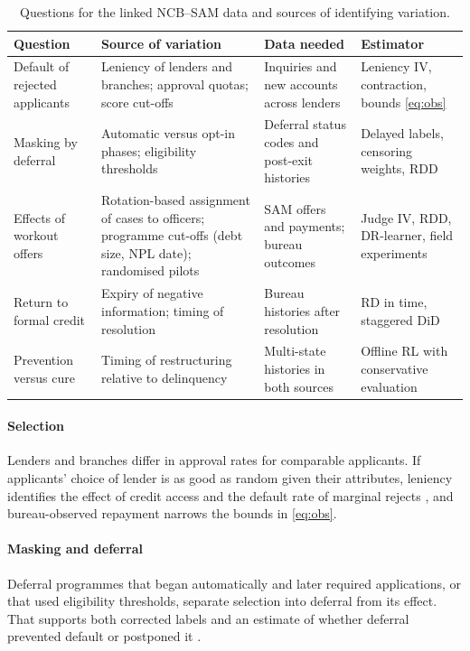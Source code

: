 \documentclass[10pt]{article}
\begin{document}
\begin{table}[t]
\centering\small
\caption{Questions for the linked NCB--SAM data and sources of identifying variation.}
\label{tab:agenda}
\begin{tabularx}{\textwidth}{>{\raggedright\arraybackslash}p{2.9cm} >{\raggedright\arraybackslash}X >{\raggedright\arraybackslash}p{3.6cm} >{\raggedright\arraybackslash}p{3.2cm}}
\toprule
Question & Source of variation & Data needed & Estimator \\
\midrule
Default of rejected applicants & Leniency of lenders and branches; approval quotas; score cut-offs & Inquiries and new accounts across lenders & Leniency IV, contraction, bounds \eqref{eq:obs} \\
Masking by deferral & Automatic versus opt-in phases; eligibility thresholds & Deferral status codes and post-exit histories & Delayed labels, censoring weights, RDD \\
Effects of workout offers & Rotation-based assignment of cases to officers; programme cut-offs (debt size, NPL date); randomised pilots & SAM offers and payments; bureau outcomes & Judge IV, RDD, DR-learner, field experiments \\
Return to formal credit & Expiry of negative information; timing of resolution & Bureau histories after resolution & RD in time, staggered DiD \citep{callaway2021} \\
Prevention versus cure & Timing of restructuring relative to delinquency & Multi-state histories in both sources & Offline RL with conservative evaluation \\
\bottomrule
\end{tabularx}
\end{table}

\paragraph{Selection} Lenders and branches differ in approval rates for comparable applicants. If applicants' choice of lender is as good as random given their attributes, leniency identifies the effect of credit access and the default rate of marginal rejects \citep{dobbie2021bias,kleinberg2018}, and bureau-observed repayment narrows the bounds in \eqref{eq:obs}.

\paragraph{Masking and deferral} Deferral programmes that began automatically and later required applications, or that used eligibility thresholds, separate selection into deferral from its effect. That supports both corrected labels and an estimate of whether deferral prevented default or postponed it \citep{cherry2021}.
\end{document}
